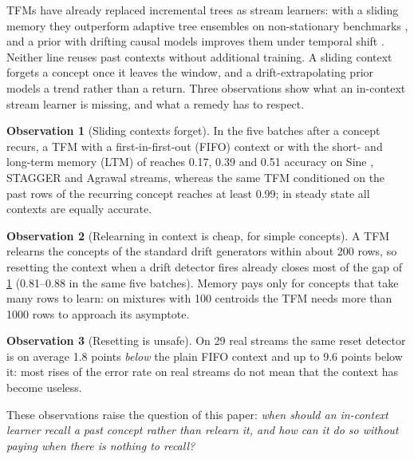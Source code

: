 \documentclass[11pt]{article}
\theoremstyle{plain}
\theoremstyle{definition}
\newtheorem{observation}{Observation}
\theoremstyle{remark}
\begin{document}
TFMs have already replaced incremental trees as stream learners: with a sliding memory they outperform adaptive tree
ensembles on non-stationary benchmarks \citep{lourenco2026streams}, and a prior with drifting causal models improves
them under temporal shift \citep{helli2024drift}. Neither line reuses past contexts without additional training. A sliding context forgets a
concept once it leaves the window, and a drift-extrapolating prior models a trend rather than a return. Three
observations show what an in-context stream learner is missing, and what a remedy has to respect.

\begin{observation}[Sliding contexts forget]\label{obs:forget}
In the five batches after a concept recurs, a TFM with a first-in-first-out (FIFO) context or with the short- and long-term memory (LTM) of
\citet{lourenco2026streams} reaches 0.17, 0.39 and 0.51 accuracy on Sine \citep{gama2004ddm}, STAGGER \citep{schlimmer1986stagger} and Agrawal
\citep{agrawal1993database} streams, whereas the
same TFM conditioned on the past rows of the recurring concept reaches at least 0.99; in steady state all contexts
are equally accurate.
\end{observation}

\begin{observation}[Relearning in context is cheap, for simple concepts]\label{obs:relearn}
A TFM relearns the concepts of the standard drift generators within about 200 rows, so resetting the context when a
drift detector fires \citep{gama2004ddm} already closes most of the gap of \cref{obs:forget} (0.81--0.88 in the same
five batches). Memory pays only for concepts that take many rows to learn: on mixtures with 100 centroids the TFM
needs more than 1000 rows to approach its asymptote.
\end{observation}

\begin{observation}[Resetting is unsafe]\label{obs:reset}
On 29 real streams the same reset detector is on average 1.8 points \emph{below} the plain FIFO context and up to 9.6
points below it: most rises of the error rate on real streams do not mean that the context has become useless.
\end{observation}

These observations raise the question of this paper: \emph{when should an in-context learner recall a past concept
rather than relearn it, and how can it do so without paying when there is nothing to recall?}
\end{document}
